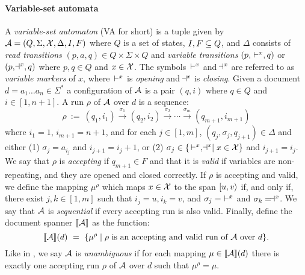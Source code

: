\paragraph{Variable-set automata} 
A {\it variable-set automaton} (VA for short) is a tuple given by $\mathcal{A} = (Q, \Sigma, \mathcal{X}, \Delta, I, F)$ where $Q$ is a set of states, $I,F\subseteq Q$, and $\Delta$ consists of {\it read transitions} $(p,a,q)\in Q\times\Sigma\times Q$ and {\it variable transitions} $(p, \, \vdash^{x}, q)$ or $(p,\!\dashv^{x},q)$ where $p, q\in Q$ and $x\in \mathcal{X}$.
The symbols $\, \vdash^{x}$ and $\!\dashv^{x}$ are referred to as {\it variable markers} of $x$, where $\, \vdash^{x}$ is {\it opening} and $\!\dashv^{x}$ is {\it closing}. Given a document $d = a_1\ldots a_n \in \Sigma^*$ a configuration of $\mathcal{A}$ is a pair $(q,i)$ where $q\in Q$ and $i\in [1, n+1]$. 
A run $\rho$ of $\mathcal{A}$ over $d$ is a sequence:
\[
\rho \ := \ (q_1, i_1)\xrightarrow{\sigma_1} (q_2,i_2) \xrightarrow{\sigma_2}\cdots\xrightarrow{\sigma_m}(q_{m+1}, i_{m+1})
\] 
where $i_1 = 1$, $i_{m+1} = n+1$, and for each $j\in[1,m]$, $(q_j, \sigma_{j},q_{j+1}) \in \Delta$ and either 
(1) $\sigma_{j} = a_{i_j}$ and $i_{j+1} = i_j + 1$, or (2) $\sigma_{j}\in \{\, \vdash^{x} , \!\dashv^{x}\mid x\in\mathcal{X}\}$ and $i_{j+1} = i_j$. We say that $\rho$ is {\it accepting} if $q_{m+1}\in F$ and that it is {\it valid} if variables are non-repeating, and they are opened and closed correctly. 
If $\rho$ is accepting and valid, we define the mapping $\mu^\rho$ which maps $x\in \mathcal{X}$ to the span $[u,v\rangle$ if, and only if, there exist $j,k\in[1,m]$ such that $i_j = u, i_k = v$, and $\sigma_j =\, \, \vdash^{x}$ and $\sigma_k = \!\dashv^{x}$. We say that $\mathcal{A}$ is {\it sequential} if every accepting run is also valid. Finally, define the document spanner ${\llbracket{\mathcal{A}}\rrbracket}$ as the function:
\[
{\llbracket{\mathcal{A}}\rrbracket}(d) \ = \  \{\mu^\rho\mid \rho \text{ is an accepting and valid run of $\mathcal{A}$ over $d$}\}.
\] 
Like in \rts, we say $\mathcal{A}$ is {\it unambiguous} if for each mapping $\mu\in{\llbracket{\mathcal{A}}\rrbracket}(d)$ there is exactly one accepting run $\rho$ of $\mathcal{A}$ over $d$ such that $\mu^\rho = \mu$.

